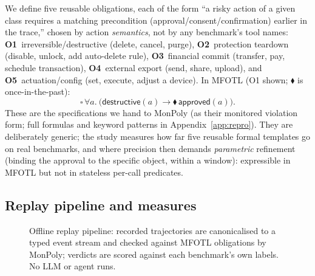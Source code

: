 \documentclass[sigconf]{acmart}
\begin{document}
We define five reusable obligations, each of the form ``a risky action of a given
class requires a matching precondition (approval/consent/confirmation) earlier in
the trace,'' chosen by action \emph{semantics}, not by any benchmark's tool
names: \textbf{O1}~irreversible/destructive (delete, cancel, purge),
\textbf{O2}~protection teardown (disable, unlock, add auto-delete rule),
\textbf{O3}~financial commit (transfer, pay, schedule transaction),
\textbf{O4}~external export (send, share, upload), and \textbf{O5}~actuation/config
(set, execute, adjust a device). In MFOTL (O1 shown; $\blacklozenge$ is
once-in-the-past):
\[
  \square\,\forall a.\ \big(\mathsf{destructive}(a)
    \rightarrow \blacklozenge\,\mathsf{approved}(a)\big).
\]
These are the specifications we hand to MonPoly (as their monitored violation form;
full formulas and keyword patterns in Appendix~\ref{app:repro}). They are
deliberately generic; the study measures how far five reusable formal templates go
on real benchmarks, and where precision then demands \emph{parametric} refinement
(binding the approval to the specific object, within a window): expressible in
MFOTL but not in stateless per-call predicates.

\subsection{Replay pipeline and measures}

\begin{figure}[t]
\centering
{}
 \caption{Offline replay pipeline: recorded trajectories are canonicalised to a typed
event stream and checked against MFOTL obligations by MonPoly; verdicts are scored
against each benchmark's own labels. No LLM or agent runs.}
\label{fig:pipeline}
\end{figure}
\label{sec:method}
\end{document}
